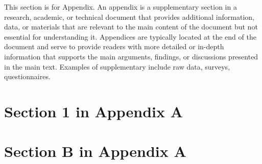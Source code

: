 

\label{apd:AppendixA}
This section is for Appendix. An appendix is a supplementary section in a research, academic, or technical document that provides additional information, data, or materials that are relevant to the main content of the document but not essential for understanding it. Appendices are typically located at the end of the document and serve to provide readers with more detailed or in-depth information that supports the main arguments, findings, or discussions presented in the main text. Examples of supplementary include raw data, surveys, questionnaires.

\section{Section 1 in Appendix A}
\label{sec: AppendixA1}
   

\section{Section B in Appendix A}
\label{sec: AppendixA2}